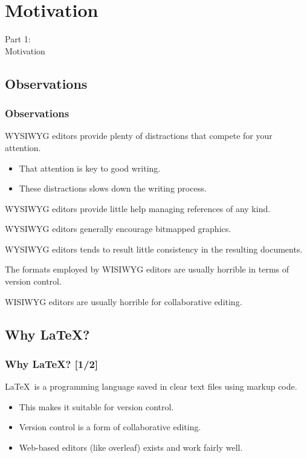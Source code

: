 {
\renewcommand{\bgcolor}{motivation}

\section{Motivation}
\begin{frame}
  \vspace{25mm}
  \begin{center}
    \Huge{Part 1:\\Motivation}
  \end{center}
\end{frame}

\subsection{Observations}
\begin{frame}[fragile]
  \frametitle{Observations}
  \vspace{3mm}
  WYSIWYG editors provide plenty of distractions that compete for your attention.
  \begin{itemize}
    \item That attention is key to good writing.
    \item These distractions slows down the writing process.
  \end{itemize}
  
  \vspace{5mm}
  WYSIWYG editors provide little help managing references of any kind.
  
  \vspace{5mm}
  WYSIWYG editors generally encourage bitmapped graphics.
  
  \vspace{5mm}
  WYSIWYG editors tends to result little consistency in the resulting documents.
  
  \vspace{5mm}
  The formats employed by WISIWYG editors are usually horrible in terms of version control.
  
  \vspace{5mm}
  WISIWYG editors are usually horrible for collaborative editing.
\end{frame}

\subsection{Why \LaTeX?}
\begin{frame}[fragile]
  \frametitle{Why \LaTeX? [1/2]}
  \vspace{3mm}
  \LaTeX\ is a programming language saved in clear text files using markup code.
  \begin{itemize}
    \item This makes it suitable for version control.
    \item Version control is a form of collaborative editing.
    \item Web-based editors (like overleaf) exists and work fairly well.
  \end{itemize}
  

\end{frame}}
